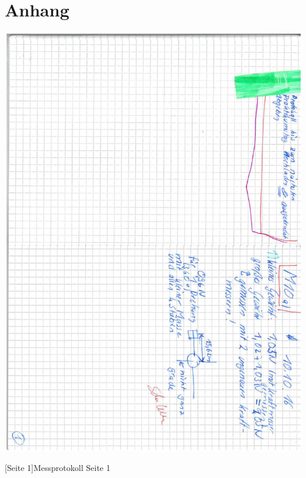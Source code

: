 \documentclass[12pt,a4paper,]{scrreprt}
\begin{document}
    \chapter{Anhang}
    	\begin{center}
    		\includegraphics[scale=0.65]{1.pdf}
    	\end{center}
    	[Seite 1]{Messprotokoll Seite 1}
    	\pagebreak
    	
\end{document}
